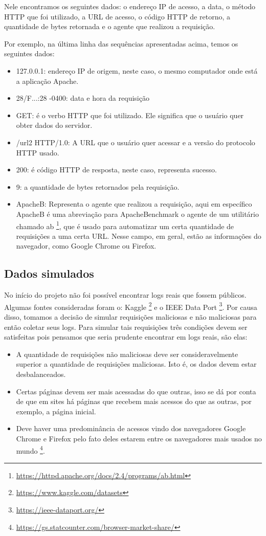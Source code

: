Nele encontramos os seguintes dados: o endereço IP de acesso, a data, o método HTTP que foi utilizado, 
a URL de acesso, o código HTTP de retorno, a quantidade de bytes retornada e o agente que realizou a requisição.

Por exemplo, na última linha das sequências apresentadas acima, temos os seguintes dados:

\begin{itemize}
    \item 127.0.0.1: endereço IP de origem, neste caso, o mesmo computador onde está a aplicação Apache.
    \item 28/F...:28 -0400: data e hora da requisição
    \item GET: é o verbo HTTP que foi utilizado. Ele significa que o usuário quer obter dados do servidor.
    \item /url2 HTTP/1.0: A URL que o usuário quer acessar e a versão do protocolo HTTP usado.
    \item 200: é código HTTP de resposta, neste caso, representa sucesso.
    \item 9: a quantidade de bytes retornados pela requisição. 
    \item ApacheB: Representa o agente que realizou a requisição, aqui em específico ApacheB é uma
    abreviação para ApacheBenchmark o agente de um utilitário chamado ab \footnote{\url{https://httpd.apache.org/docs/2.4/programs/ab.html}}, 
    que é usado para automatizar um certa quantidade de requisições a uma certa URL.
    Nesse campo, em geral, estão as informações do navegador, como Google Chrome ou Firefox.
\end{itemize}


\subsection{Dados simulados}

No início do projeto não foi possível encontrar logs reais que fossem públicos. Algumas fontes
consideradas foram o: Kaggle \footnote{\url{https://www.kaggle.com/datasets}} e o IEEE Data Port 
\footnote{\url{https://ieee-dataport.org/}}. Por causa disso, tomamos a decisão de simular requisições maliciosas 
e não maliciosas para então coletar seus logs. Para simular tais requisições três condições devem 
ser satisfeitas pois pensamos que seria prudente encontrar em logs reais, são elas:

\begin{itemize}
    \item A quantidade de requisições não maliciosas deve ser consideravelmente
    superior a quantidade de requisições maliciosas. Isto é, os dados devem estar desbalanceados.
    \item Certas páginas devem ser mais acessadas do que outras, isso se dá por conta 
    de que em sites há páginas que recebem mais acessos do que as outras, por exemplo, a página inicial.
    \item Deve haver uma predominância de acessos vindo dos navegadores Google Chrome e Firefox pelo fato 
    deles estarem entre os navegadores mais usados no mundo \footnote{\url{https://gs.statcounter.com/browser-market-share/}}.
\end{itemize}

